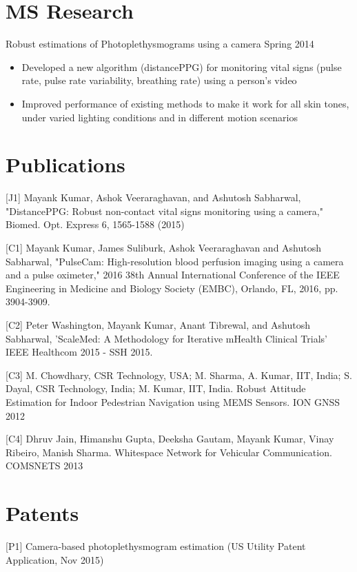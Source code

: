 \documentclass[margin]{res}
\begin{document}
\begin{resume}
\section{MS Research}
Robust estimations of Photoplethysmograms using a camera \hfill{Spring 2014 }\\
 \begin{itemize} \itemsep -2pt  %
 \item Developed a new algorithm (distancePPG) for monitoring vital signs (pulse rate, pulse rate variability, breathing rate) using a person's video 
 \item Improved performance of existing methods to make it work for all skin tones, under varied lighting conditions and in different motion scenarios 
 \end{itemize}

\section{Publications}
[J1] Mayank Kumar, Ashok Veeraraghavan, and Ashutosh Sabharwal, "DistancePPG: Robust non-contact vital signs monitoring using a camera," Biomed. Opt. Express 6, 1565-1588 (2015)

[C1] Mayank Kumar, James Suliburk, Ashok Veeraraghavan and Ashutosh Sabharwal, "PulseCam: High-resolution blood perfusion imaging using a camera and a pulse oximeter," 2016 38th Annual International Conference of the IEEE Engineering in Medicine and Biology Society (EMBC), Orlando, FL, 2016, pp. 3904-3909.

[C2] Peter Washington, Mayank Kumar, Anant Tibrewal, and Ashutosh Sabharwal, 'ScaleMed: A Methodology for Iterative mHealth Clinical Trials' IEEE Healthcom 2015 - SSH 2015.

[C3] M. Chowdhary, CSR Technology, USA; M. Sharma, A. Kumar, IIT, India; S. Dayal, CSR Technology, India; M. Kumar, IIT, India. Robust Attitude Estimation for Indoor Pedestrian Navigation using MEMS Sensors. ION GNSS 2012 

[C4] Dhruv Jain, Himanshu Gupta, Deeksha Gautam, Mayank Kumar, Vinay Ribeiro, Manish Sharma. Whitespace Network for Vehicular Communication. COMSNETS 2013

\section{Patents}
[P1] Camera-based photoplethysmogram estimation (US Utility Patent Application, Nov 2015) 


\end{resume}
\end{document}
